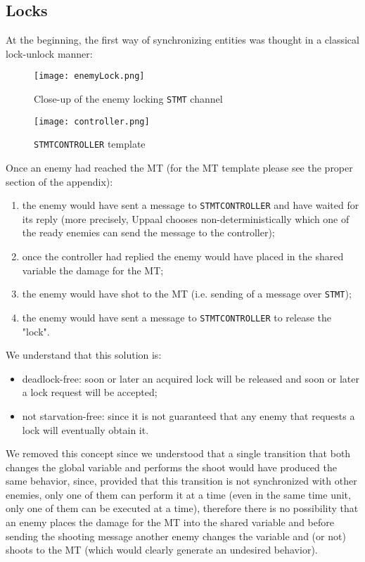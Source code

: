 \documentclass[
10pt, %
a4paper, %
oneside, %
headinclude,footinclude, %
BCOR5mm, %
]{scrartcl}
\begin{document}
		\subsection{Locks}
			At the beginning, the first way of synchronizing entities was thought in a classical lock-unlock manner:
			\begin{figure}[h!]
				\centering
				\begin{minipage}{.5\textwidth}
					\centering
					\texttt{[image: enemyLock.png]}
					\caption{Close-up of the enemy locking \texttt{STMT} channel}
				\end{minipage}
				\begin{minipage}{.4\textwidth}
					\centering
					\texttt{[image: controller.png]}
					\caption{\texttt{STMTCONTROLLER} template}
				\end{minipage}
			\end{figure}
			Once an enemy had reached the MT (for the MT template please see the proper section of the appendix):
			\begin{enumerate}
				\item the enemy would have sent a message to \texttt{STMTCONTROLLER} and have waited for its reply (more precisely, Uppaal chooses non-deterministically which one of the ready enemies can send the message to the controller);
				\item once the controller had replied the enemy would have placed in the shared variable the damage for the MT;
				\item the enemy would have shot to the MT (i.e. sending of a message over \texttt{STMT});
				\item the enemy would have sent a message to \texttt{STMTCONTROLLER} to release the "lock".
			\end{enumerate}
			We understand that this solution is:
			\begin{itemize}
				\item deadlock-free: soon or later an acquired lock will be released and soon or later a lock request will be accepted;
				\item not starvation-free: since it is not guaranteed that any enemy that requests a lock will eventually obtain it.
			\end{itemize}
			We removed this concept since we understood that a single transition that both changes the global variable and performs the shoot would have produced the same behavior, since, provided that this transition is not synchronized with other enemies, only one of them can perform it at a time (even in the same time unit, only one of them can be executed at a time), therefore there is no possibility that an enemy places the damage for the MT into the shared variable and before sending the shooting message another enemy changes the variable and (or not) shoots to the MT (which would clearly generate an undesired behavior).
\end{document}
